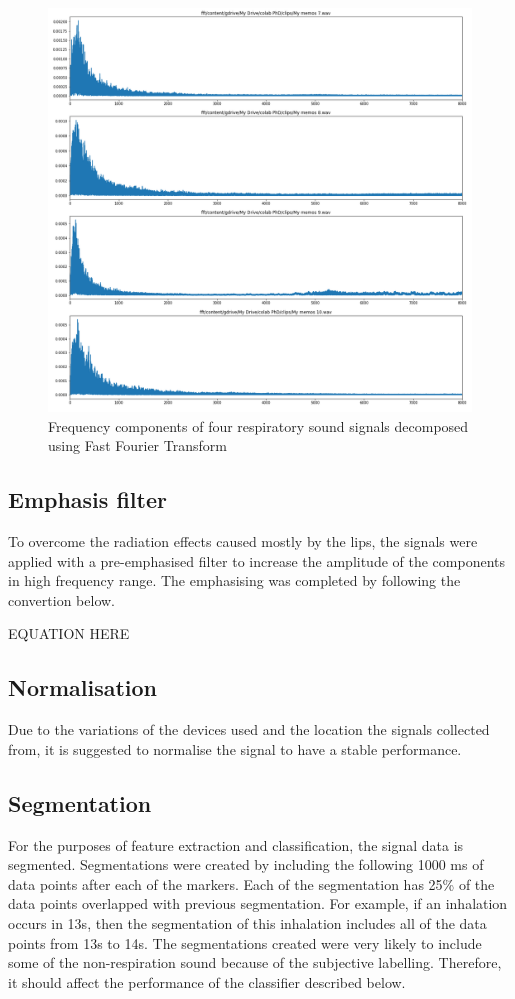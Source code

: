 \begin{figure}[h]
    \centerline{\includegraphics[scale=0.33]{figures/fft.png}}
    \caption{Frequency components of four respiratory sound signals decomposed using Fast Fourier Transform}
    \label{fig:fft}
\end{figure}
\subsection{Emphasis filter}
To overcome the radiation effects caused mostly by the lips, the signals were applied with a pre-emphasised filter to increase the amplitude of the components in high frequency range. The emphasising was completed by following the convertion below.

EQUATION HERE
\subsection{Normalisation}
Due to the variations of the devices used and the location the signals collected from, it is suggested to normalise the signal to have a stable performance.

\subsection{Segmentation}
For the purposes of feature extraction and classification, the signal data is segmented. Segmentations were created by including the following 1000 ms of data points after each of the markers. Each of the segmentation has 25\% of the data points overlapped with previous segmentation. For example, if an inhalation occurs in 13s, then the segmentation of this inhalation includes all of the data points from 13s to 14s. The segmentations created were very likely to include some of the non-respiration sound because of the subjective labelling. Therefore, it should affect the performance of the classifier described below.

